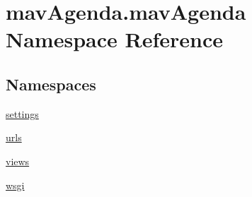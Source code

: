 \hypertarget{namespacemavAgenda_1_1mavAgenda}{}\section{mav\+Agenda.\+mav\+Agenda Namespace Reference}
\label{namespacemavAgenda_1_1mavAgenda}
\subsection*{Namespaces}
\begin{DoxyCompactItemize}
\item 
 \mbox{\hyperlink{namespacemavAgenda_1_1mavAgenda_1_1settings}{settings}}
\item 
 \mbox{\hyperlink{namespacemavAgenda_1_1mavAgenda_1_1urls}{urls}}
\item 
 \mbox{\hyperlink{namespacemavAgenda_1_1mavAgenda_1_1views}{views}}
\item 
 \mbox{\hyperlink{namespacemavAgenda_1_1mavAgenda_1_1wsgi}{wsgi}}
\end{DoxyCompactItemize}
